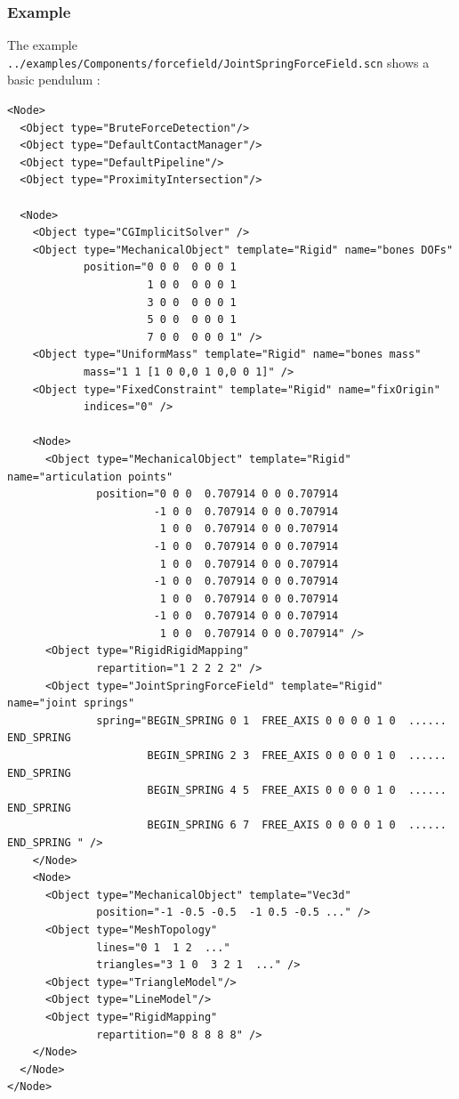 \subsubsection {Example}

The example \texttt{../examples/Components/forcefield/JointSpringForceField.scn} shows a basic pendulum :

\begin{verbatim}
<Node>
  <Object type="BruteForceDetection"/>
  <Object type="DefaultContactManager"/>
  <Object type="DefaultPipeline"/>
  <Object type="ProximityIntersection"/>

  <Node>
    <Object type="CGImplicitSolver"	/>
    <Object type="MechanicalObject" template="Rigid" name="bones DOFs"
            position="0 0 0  0 0 0 1 
                      1 0 0  0 0 0 1 
                      3 0 0  0 0 0 1 
                      5 0 0  0 0 0 1 
                      7 0 0  0 0 0 1" />
    <Object type="UniformMass" template="Rigid" name="bones mass"
            mass="1 1 [1 0 0,0 1 0,0 0 1]" />
    <Object type="FixedConstraint" template="Rigid" name="fixOrigin"
            indices="0" />
		
    <Node>
      <Object type="MechanicalObject" template="Rigid" name="articulation points"
              position="0 0 0  0.707914 0 0 0.707914 
                       -1 0 0  0.707914 0 0 0.707914 
                        1 0 0  0.707914 0 0 0.707914 
                       -1 0 0  0.707914 0 0 0.707914 
                        1 0 0  0.707914 0 0 0.707914 
                       -1 0 0  0.707914 0 0 0.707914 
                        1 0 0  0.707914 0 0 0.707914 
                       -1 0 0  0.707914 0 0 0.707914 
                        1 0 0  0.707914 0 0 0.707914" />
      <Object type="RigidRigidMapping"
              repartition="1 2 2 2 2" />
      <Object type="JointSpringForceField" template="Rigid" name="joint springs"
              spring="BEGIN_SPRING 0 1  FREE_AXIS 0 0 0 0 1 0  ......  END_SPRING 
                      BEGIN_SPRING 2 3  FREE_AXIS 0 0 0 0 1 0  ......  END_SPRING 
                      BEGIN_SPRING 4 5  FREE_AXIS 0 0 0 0 1 0  ......  END_SPRING 
                      BEGIN_SPRING 6 7  FREE_AXIS 0 0 0 0 1 0  ......  END_SPRING " />
    </Node>
    <Node>
      <Object type="MechanicalObject" template="Vec3d"
              position="-1 -0.5 -0.5  -1 0.5 -0.5 ..." />
      <Object type="MeshTopology"
              lines="0 1  1 2  ..."
              triangles="3 1 0  3 2 1  ..." />
      <Object type="TriangleModel"/>
      <Object type="LineModel"/>
      <Object type="RigidMapping"
              repartition="0 8 8 8 8" />
    </Node>
  </Node>
</Node>

\end{verbatim}

